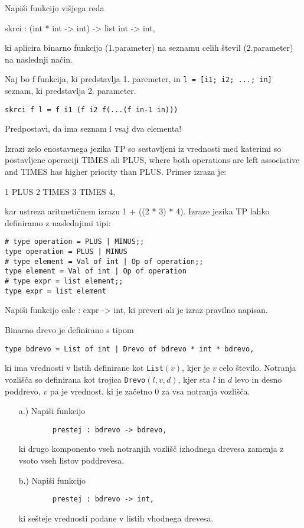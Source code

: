 \begin{ex}
\end{ex} \begin{ex}
Napi\v si funkcijo vi\v sjega reda 

skrci : (int * int -> int) -> list int -> int, 

ki aplicira binarno funkcijo (1.parameter) na seznamu celih \v stevil (2.parameter) na naslednji na\v cin. 

Naj bo f funkcija, ki predstavlja 1. paremeter, in 
\texttt{l = [i1; i2; ...; in] }
seznam, ki predstavlja 2. parameter. 
\begin{verbatim}
skrci f l = f i1 (f i2 f(...(f in-1 in)))
\end{verbatim}

Predpostavi, da ima seznam l vsaj dva elementa!  


\end{ex} \begin{ex}
Izrazi zelo enostavnega jezika TP so sestavljeni iz vrednosti med katerimi so postavljene operaciji TIMES ali PLUS, where both operations are left associative and TIMES has higher priority than PLUS. Primer izraza je:

1 PLUS 2 TIMES 3 TIMES 4,

kar ustreza aritmeti\v cnem izrazu 1 + ((2 * 3) * 4). Izraze jezika TP lahko definiramo z naslednjimi tipi:
 
\begin{verbatim}
# type operation = PLUS | MINUS;; 
type operation = PLUS | MINUS 
# type element = Val of int | Op of operation;; 
type element = Val of int | Op of operation
# type expr = list element;;
type expr = list element

\end{verbatim}
Napi\v si funkcijo calc : expr -> int, ki preveri ali je izraz pravilno napisan. 


\end{ex} \begin{ex}
Binarno drevo je definirano s tipom
\begin{verbatim}
type bdrevo = List of int | Drevo of bdrevo * int * bdrevo,
\end{verbatim}
ki ima vrednosti v listih definirane kot \texttt{List}$(v)$, kjer je $v$ celo \v stevilo.  Notranja vozli\v s\v ca so definirana kot trojica \texttt{Drevo}$(l, v, d)$, kjer sta $l$ in $d$ levo in desno poddrevo, $v$ pa je vrednost, ki je za\v cetno $0$ za vsa notranja vozli\v s\v ca.

\begin{itemize}
    \item[a.)] Napi\v si funkcijo 
        \begin{verbatim}
        prestej : bdrevo -> bdrevo,
        \end{verbatim}
        ki drugo komponento vseh notranjih vozli\v s\v c izhodnega drevesa zamenja z vsoto vseh listov poddrevesa.
    \item[b.)] Napi\v si funkcijo 
        \begin{verbatim}
        prestej : bdrevo -> int, 
        \end{verbatim}
        ki se\v steje vrednosti podane  v listih vhodnega drevesa. 
\end{itemize}


\end{ex}

